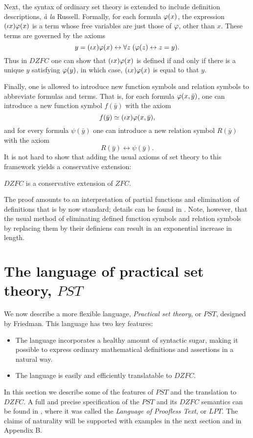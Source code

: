 \documentclass{llncs}
\newcommand{\liff}{\leftrightarrow}
\newcommand{\na}[1]{\mathit{#1}}    \newcommand{\fn}[1]{\mathit{#1}}    \newcommand{\ax}[1]{\mathit{(#1)}}  \newcommand{\mdl}[1]{\mathcal{#1}}
\begin{document}
Next, the syntax of ordinary set theory is extended to include
definition descriptions, \emph{\`a la} Russell. Formally, for each
formula $\varphi(x)$, the expression $(\iota x) \varphi(x)$ is a term whose
free variables are just those of $\varphi$, other than $x$. These terms
are governed by the axioms
\[
y = (\iota x) \ph(x) \liff \fa z(\ph(z) \liff z = y).
\]
Thus in $\na{DZFC}$ one can show that $(\iota x) \varphi(x)$ is defined if
and only if there is a unique $y$ satisfying $\varphi(y)$, in which case,
$(\iota x) \varphi(x)$ is equal to that $y$. 

Finally, one is allowed to introduce new function symbols and relation
symbols to abbreviate formulas and terms. That is, for each formula
$\varphi(x,\bar y)$, one can introduce a new function symbol $f(\bar y)$
with the axiom
\[
f(\bar y) \simeq (\iota x) \varphi(x,\bar y),
\]
and for every formula $\psi(\bar y)$ one can introduce a new relation
symbol $R(\bar y)$ with the axiom
\[
R(\bar y) \liff \psi(\bar y).
\]
It is not hard to show that adding the usual axioms of set theory to
this framework yields a conservative extension:

\begin{theorem}
$\na{DZFC}$ is a conservative extension of $\na{ZFC}$.
\end{theorem}

The proof amounts to an interpretation of partial functions and
elimination of definitions that is by now standard; details can be
found in \cite{troelstra:schwichtenberg:00,kieffer:07}. Note, however,
that the usual method of eliminating defined function symbols and
relation symbols by replacing them by their definiens can result in an
exponential increase in length.

\section{The language of practical set theory, $\na{PST}$}
\label{PST_section}

We now describe a more flexible language, \emph{Practical set theory},
or $\na{PST}$, designed by Friedman. This language has two key
features:
\begin{itemize}
\item The language incorporates a healthy amount of syntactic sugar,
  making it possible to express ordinary mathematical definitions and
  assertions in a natural way.
\item The language is easily and efficiently translatable to
  $\na{DZFC}$. 
\end{itemize}
In this section we describe some of the features of $\na{PST}$ and
the translation to $\na{DZFC}$. A full and precise specification of
the $\na{PST}$ and its $\na{DZFC}$ semantics can be found in
\cite{kieffer:07,friedman:unp:05}, where it was called the
\emph{Language of Proofless Text}, or $\na{LPT}$.  The claims of
naturality will be supported with examples in the next section and in
Appendix B.
\end{document}
